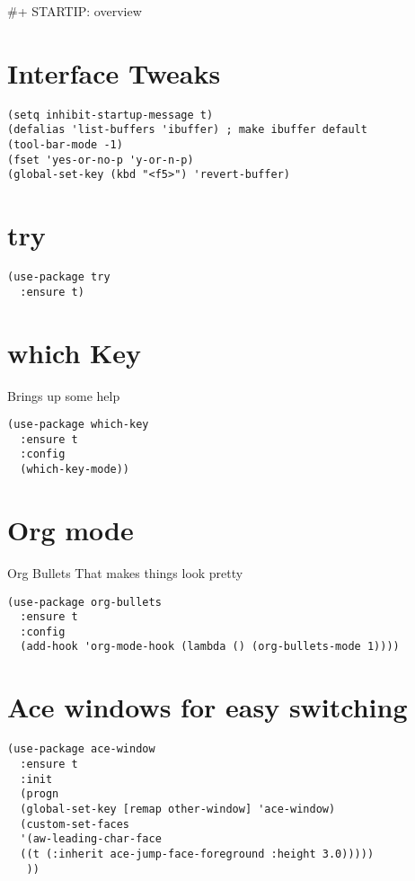 \documentclass[11pt]{article}
\date{\today}
\title{}
\begin{document}
\tableofcontents

\#+ STARTIP: overview
\section{Interface Tweaks}
\label{sec:orgc7ad6a9}
\begin{verbatim}
(setq inhibit-startup-message t)
(defalias 'list-buffers 'ibuffer) ; make ibuffer default
(tool-bar-mode -1)
(fset 'yes-or-no-p 'y-or-n-p)
(global-set-key (kbd "<f5>") 'revert-buffer)
\end{verbatim}

\section{try}
\label{sec:orgd43d58d}
\begin{verbatim}
(use-package try
  :ensure t)
\end{verbatim}

\section{which Key}
\label{sec:org74ec5f0}
Brings up some help
\begin{verbatim}
(use-package which-key
  :ensure t
  :config
  (which-key-mode))
\end{verbatim}

\section{Org mode}
\label{sec:org8787e37}
Org Bullets That makes things look pretty
\begin{verbatim}
(use-package org-bullets
  :ensure t
  :config
  (add-hook 'org-mode-hook (lambda () (org-bullets-mode 1))))
\end{verbatim}

\section{Ace windows for easy switching}
\label{sec:orgf742fe5}
\begin{verbatim}
(use-package ace-window
  :ensure t
  :init
  (progn
  (global-set-key [remap other-window] 'ace-window)
  (custom-set-faces
  '(aw-leading-char-face
  ((t (:inherit ace-jump-face-foreground :height 3.0)))))
   ))
\end{verbatim}
\end{document}
